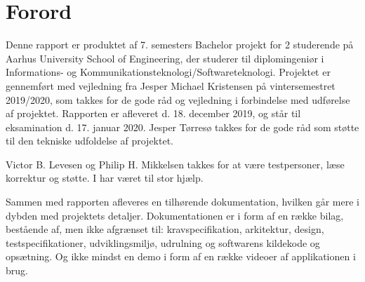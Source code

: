 \chapter{Forord}

Denne rapport er produktet af 7. semesters Bachelor projekt for 2 studerende på Aarhus University School of Engineering, der studerer til diplomingeniør i Informations- og Kommunikationsteknologi/Softwareteknologi. Projektet er gennemført med vejledning fra Jesper Michael Kristensen på vintersemestret 2019/2020, som takkes for de gode råd og vejledning i forbindelse med udførelse af projektet. Rapporten er afleveret d. 18. december 2019, og står til eksamination d. 17. januar 2020. Jesper Tørresø takkes for de gode råd som støtte til den tekniske udfoldelse af projektet.

Victor B. Levesen og Philip H. Mikkelsen takkes for at være testpersoner, læse korrektur og støtte. I har været til stor hjælp.

Sammen med rapporten afleveres en tilhørende dokumentation, hvilken går mere i dybden med projektets detaljer. Dokumentationen er i form af en række bilag, bestående af, men ikke afgrænset til: kravspecifikation, arkitektur, design, testspecifikationer, udviklingsmiljø, udrulning og softwarens kildekode og opsætning. Og ikke mindst en demo i form af en række videoer af applikationen i brug.
